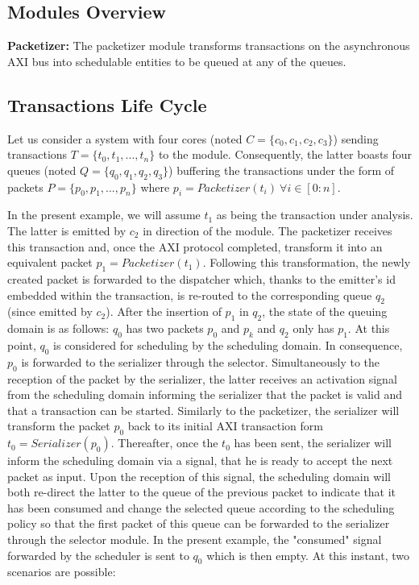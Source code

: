 \subsection{Modules Overview}

\par{\bf Packetizer:} The packetizer module transforms transactions on
the asynchronous AXI bus into schedulable entities to be queued at any
of the \schim queues.

\subsection{Transactions Life Cycle}
\label{subsec:transaction-life-cycle}

Let us consider a system with four cores (noted $C = \{c_{0}, c_{1},
c_{2}, c_{3}\}$) sending transactions $T = \{t_{0}, t_{1}, ...,
t_{n}\}$ to the \schim module.  Consequently, the latter boasts four
queues (noted $Q = \{q_{0}, q_{1}, q_{2}, q_{3}\}$) buffering the
transactions under the form of packets $P = \{p_{0}, p_{1}, ...,
p_{n}\}$ where $p_{i} = Packetizer(t_{i})~\forall i \in [0 : n]$.

In the present example, we will assume $t_{1}$ as being the
transaction under analysis.  The latter is emitted by $c_{2}$ in
direction of the \schim module.  The packetizer receives this
transaction and, once the AXI protocol completed, transform it into an
equivalent packet $p_{1} = Packetizer(t_{1})$.  Following this
transformation, the newly created packet is forwarded to the
dispatcher which, thanks to the emitter's id embedded within the
transaction, is re-routed to the corresponding queue $q_{2}$ (since
emitted by $c_{2}$).  After the insertion of $p_{1}$ in $q_{2}$, the
state of the queuing domain is as follows: $q_{0}$ has two packets
$p_{0}$ and $p_{k}$ and $q_{2}$ only has $p_{1}$.  At this point,
$q_{0}$ is considered for scheduling by the scheduling domain.  In
consequence, $p_{0}$ is forwarded to the serializer through the
selector.  Simultaneously to the reception of the packet by the
serializer, the latter receives an activation signal from the
scheduling domain informing the serializer that the packet is valid
and that a transaction can be started.  Similarly to the packetizer,
the serializer will transform the packet $p_{0}$ back to its initial
AXI transaction form $t_{0} = Serializer(p_{0})$.  Thereafter, once
the $t_{0}$ has been sent, the serializer will inform the scheduling
domain via a signal, that he is ready to accept the next packet as
input.  Upon the reception of this signal, the scheduling domain will
both re-direct the latter to the queue of the previous packet to
indicate that it has been consumed and change the selected queue
according to the scheduling policy so that the first packet of this
queue can be forwarded to the serializer through the selector module.
In the present example, the "consumed" signal forwarded by the
scheduler is sent to $q_{0}$ which is then empty.  At this instant,
two scenarios are possible:

